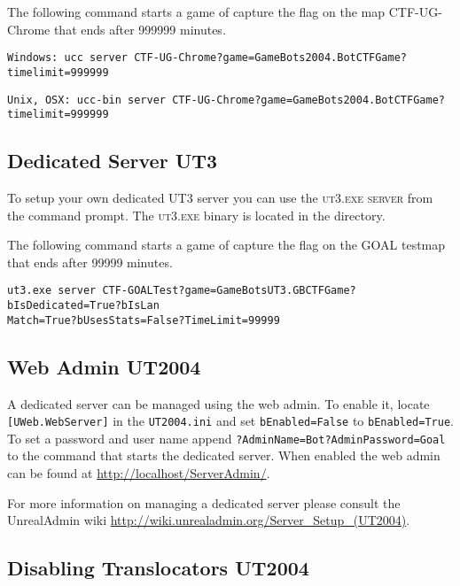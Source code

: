 \documentclass[11pt,a4paper]{article}
\begin{document}
The following command starts a game of capture the flag on the map CTF-UG-Chrome that ends after 999999 minutes. 

\begin{verbatim}
Windows: ucc server CTF-UG-Chrome?game=GameBots2004.BotCTFGame?timelimit=999999
\end{verbatim}	
\begin{verbatim}
Unix, OSX: ucc-bin server CTF-UG-Chrome?game=GameBots2004.BotCTFGame?timelimit=999999
\end{verbatim}	

\subsection{Dedicated Server UT3}

To setup your own dedicated UT3 server you can use the \textsc{ut3.exe server} from the command prompt. The \textsc{ut3.exe} binary is located in the  directory.

The following command starts a game of capture the flag on the GOAL testmap that ends after 99999 minutes.

\begin{verbatim}
ut3.exe server CTF-GOALTest?game=GameBotsUT3.GBCTFGame?bIsDedicated=True?bIsLan
Match=True?bUsesStats=False?TimeLimit=99999
\end{verbatim}


\subsection{Web Admin UT2004}

A dedicated server can be managed using the web admin. To enable it, locate \texttt{[UWeb.WebServer]} in the \texttt{UT2004.ini} and set \texttt{bEnabled=False} to \texttt{bEnabled=True}. To set a password and user name append \verb|?AdminName=Bot?AdminPassword=Goal| to the command that starts the dedicated server. When enabled the web admin can be found at \url{http://localhost/ServerAdmin/}. 

For more information on managing a dedicated server please consult the UnrealAdmin wiki \url{http://wiki.unrealadmin.org/Server_Setup_(UT2004)}.

\subsection{Disabling Translocators UT2004}
\end{document}

